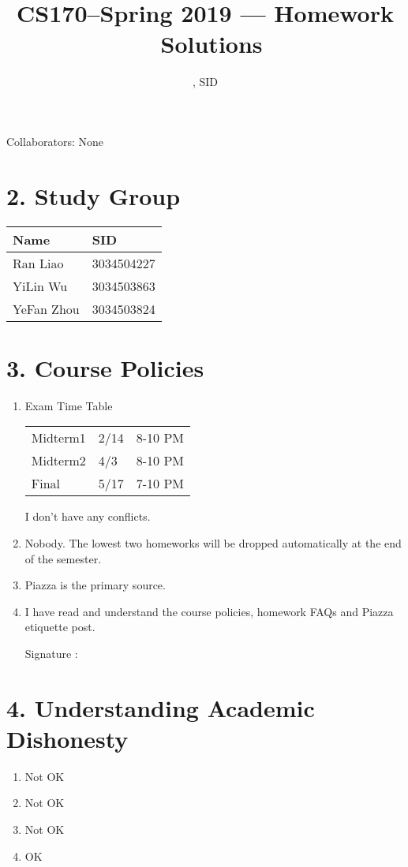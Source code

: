 \documentclass[11pt]{article}
\title{CS170--Spring 2019 --- Homework \Homework\ Solutions}
\author{\Name, SID \SID}
\date{}
\newenvironment{qparts}{\begin{enumerate}[{(}a{)}]}{\end{enumerate}}
\begin{document}
\maketitle
Collaborators: None

\section*{2. Study Group}
\begin{tabular}{ll}
    Name        &   SID         \\\hline
    Ran Liao    &   3034504227  \\  
    YiLin Wu    &   3034503863  \\
    YeFan Zhou  &   3034503824 
\end{tabular}

\newpage
\section*{3. Course Policies}
\begin{qparts}
\item Exam Time Table

\begin{tabular}{lll}
    Midterm1    &   2/14    &   8-10 PM     \\   
    Midterm2    &   4/3     &   8-10 PM     \\   
    Final       &   5/17    &   7-10 PM     \\   
\end{tabular}

I don't have any conflicts.

\item Nobody. The lowest two homeworks will be dropped automatically at the end of the semester.

\item Piazza is the primary source.

\item I have read and understand the course policies, homework FAQs and Piazza etiquette post.

Signature : 

\end{qparts}

\newpage
\section*{4. Understanding Academic Dishonesty}
\begin{qparts}
\item Not OK
\item Not OK
\item Not OK
\item OK

\end{qparts}
\end{document}
